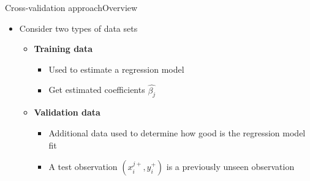 \documentclass[hyperref={pdfpagelabels=false}]{beamer}
\begin{document}
\begin{frame}{Cross-validation approach}{Overview}
	\begin{itemize}
			
		
		\item Consider two types of data sets
		\vspace{0.2cm}
		\begin{itemize}
			\item[1.] \textbf{Training data} 
			\vspace{0.2cm}
			\begin{itemize}
				\item Used to estimate a regression model
							\vspace{0.2cm}
				\item Get estimated coefficients $\hat{\beta_{j}}$
			\end{itemize}
			\vspace{0.2cm}
			\item[2.] \textbf{Validation data} 
			\vspace{0.2cm}
			\begin{itemize}
				\item Additional data used to determine how good is the regression model fit
				\vspace{0.2cm}
				\item A test observation $(x^{j+}_{i},y^{+}_{i})$ is a previously unseen observation
			\end{itemize}
		\end{itemize}
	
			
		
	\end{itemize}
\end{frame}



%		
%		
\end{document}

